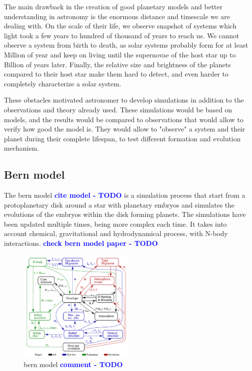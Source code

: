 \documentclass[a4paper, 11pt]{article}
\newcommand{\todonote}[3] {
	\textbf{\textcolor{#2}{#3 - #1}}
}
\newcommand{\todo}[1] {\todonote{TODO}{blue}{#1}}
\begin{document}
   
   	
   	The main drawback in the creation of good planetary models and better understanding in astronomy is the enormous distance and timescale we are dealing with.  On the scale of their life, we observe snapshot of systems which light took a few years to hundred of thousand of years to reach us. We cannot observe a system from birth to death, as solar systems probably form for at least Million of year and keep on living until the supernovae of the host star up to Billion of years later.  Finally, the relative size and brightness of the planets compared to their host star make them hard to detect, and even harder to completely characterize a solar system.
   	
   	These obstacles motivated astronomer to develop simulations in addition to the observations and theory already used. These simulations would be based on models, and the results would be compared to observations that would allow to verify how good the model is. They would allow to "observe" a system and their planet during their complete lifespan, to test different formation and evolution mechanism.
    
    
    \subsection{Bern model}
 	The bern model  \todo{cite model} is a simulation process that start from a protoplanetary disk around a star with planetary embryos and simulates the evolutions of the embryos within the disk forming planets. The simulations have been updated multiple times, being more complex each time.  It takes into account chemical,  gravitational  and hydrodynamical process, with N-body interactions. \todo{check bern model paper}
 	\begin{figure}[H]                                           
 		\centering \includegraphics[width=0.5\textwidth]{images/bern_model_schematics.png}
 		\caption{bern model \todo{comment}}
 		\label{fig:bern_model}
 	\end{figure}
 	 
\end{document}
